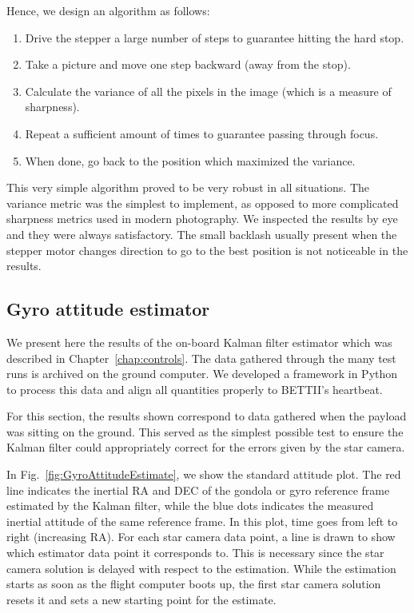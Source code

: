 Hence, we design an algorithm as follows:
\begin{enumerate}
\item Drive the stepper a large number of steps to guarantee hitting the hard stop.
\item Take a picture and move one step backward (away from the stop).
\item Calculate the variance of all the pixels in the image (which is a measure of sharpness).
\item Repeat a sufficient amount of times to guarantee passing through focus.
\item When done, go back to the position which maximized the variance.
\end{enumerate}

This very simple algorithm proved to be very robust in all situations. The variance metric was the simplest to implement, as opposed to more complicated sharpness metrics used in modern photography. We inspected the results by eye and they were always satisfactory. The small backlash usually present when the stepper motor changes direction to go to the best position is not noticeable in the results.

\subsection{Gyro attitude estimator}

We present here the results of the on-board Kalman filter estimator which was described in Chapter~\ref{chap:controls}. The data gathered through the many test runs is archived on the ground computer. We developed a framework in Python to process this data and align all quantities properly to BETTII's heartbeat. 

For this section, the results shown correspond to data gathered when the payload was sitting on the ground. This served as the simplest possible test to ensure the Kalman filter could appropriately correct for the errors given by the star camera. 

In Fig.~\ref{fig:GyroAttitudeEstimate}, we show the standard attitude plot. The red line indicates the inertial RA and DEC of the gondola or gyro reference frame estimated by the Kalman filter, while the blue dots indicates the measured inertial attitude of the same reference frame. In this plot, time goes from left to right (increasing RA). For each star camera data point, a line is drawn to show which estimator data point it corresponds to. This is necessary since the star camera solution is delayed with respect to the estimation. While the estimation starts as soon as the flight computer boots up, the first star camera solution resets it and sets a new starting point for the estimate.

